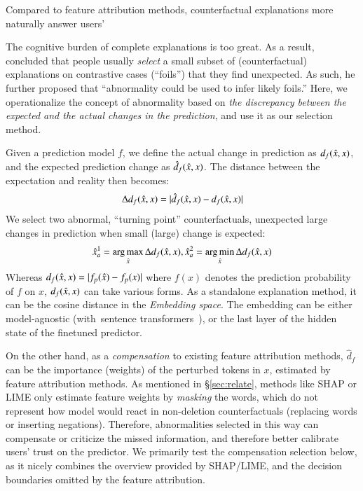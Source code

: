 Compared to feature attribution methods, counterfactual explanations more naturally answer users' 

The cognitive burden of complete explanations is too great.
As a result, \citet{miller} concluded that people usually \emph{select} a small subset of (counterfactual) explanations on contrastive cases (``foils'') that they find unexpected. 
As such, he further proposed that ``abnormality could be used to infer likely foils.''
Here, we operationalize the concept of abnormality based on \emph{the discrepancy between the expected and the actual changes in the prediction}, and use it as our selection method.

Given a prediction model $f$, we define the actual change in prediction as $d_f(\hat{x}, x)$, and the expected prediction change as $\hat{d}_f(\hat{x}, x)$.
The distance between the expectation and reality then becomes:
$$\Delta d_f(\hat{x}, x) = |\hat{d}_f(\hat{x}, x)-d_f(\hat{x}, x)|$$
We select two abnormal, ``turning point'' counterfactuals, \ie unexpected large changes in prediction when small (large) change is expected:
$$ \hat{x}_a^1 = \operatorname*{arg\,max}_{\hat{x}} \Delta d_f(\hat{x}, x), \hat{x}_a^2 = \operatorname*{arg\,min}_{\hat{x}} \Delta d_f(\hat{x}, x)$$
Whereas $d_f(\hat{x}, x)=|f_p(\hat{x})-f_p(x)|$ where $f(x)$ denotes the prediction probability of $f$ on $x$, $d_f(\hat{x}, x)$ can take various forms. 
As a standalone explanation method, it can be the cosine distance in the \emph{Embedding space}.
The embedding can be either model-agnostic (\eg with~sentence transformers~\cite{reimers-2019-sentence-bert}), or the last layer of the hidden state of the finetuned predictor.

On the other hand, as a \emph{compensation} to existing feature attribution methods, $\hat{d}_f$ can be the importance (weights) of the perturbed tokens in $x$, estimated by feature attribution methods.
As mentioned in \S\ref{sec:relate}, methods like SHAP or LIME only estimate feature weights by \emph{masking} the words, which do not represent how model would react in non-deletion counterfactuals (replacing words or inserting negations).
Therefore, abnormalities selected in this way can  compensate or criticize the missed information, and therefore better calibrate users' trust on the predictor.
We primarily test the compensation selection below, as it nicely combines the overview provided by SHAP/LIME, and the decision boundaries omitted by the feature attribution. 



